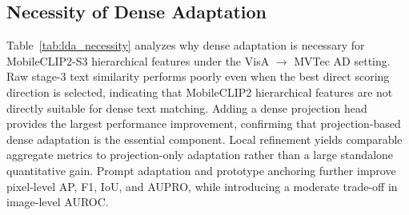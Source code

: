\documentclass[10pt]{article}
\begin{document}
\subsection{Necessity of Dense Adaptation}

Table~\ref{tab:lda_necessity} analyzes why dense adaptation is necessary for MobileCLIP2-S3 hierarchical features under the VisA $\rightarrow$ MVTec AD setting. Raw stage-3 text similarity performs poorly even when the best direct scoring direction is selected, indicating that MobileCLIP2 hierarchical features are not directly suitable for dense text matching. Adding a dense projection head provides the largest performance improvement, confirming that projection-based dense adaptation is the essential component. Local refinement yields comparable aggregate metrics to projection-only adaptation rather than a large standalone quantitative gain. Prompt adaptation and prototype anchoring further improve pixel-level AP, F1, IoU, and AUPRO, while introducing a moderate trade-off in image-level AUROC.

\begin{table}[H]
\centering
\caption{Necessity of dense adaptation for MobileCLIP2-S3 hierarchical features under the VisA $\rightarrow$ MVTec AD setting. Raw stage-3 text similarity reports the best direct score among $s_a$, $1-s_n$, $s_a-s_n$, and $s_n-s_a$, where $s_n$ and $s_a$ denote cosine similarities to the normal-object and defective-object prototypes. Results except the raw baseline are reported as mean $\pm$ standard deviation over three seeds.}
\label{tab:lda_necessity}
\end{table}
\end{document}

